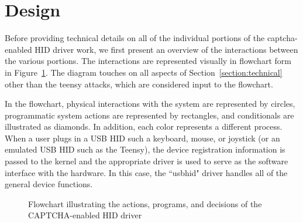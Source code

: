 \documentclass[pagenumbers]{ieee}
\begin{document}
\section{Design}
\label{section:design}

Before providing technical details on all of the individual portions of the captcha-enabled HID driver work, we first present an overview of the interactions between the various portions. The interactions are represented visually in flowchart form in Figure~\ref{fig:flowchart}. The diagram touches on all aspects of Section~\ref{section:technical} other than the teensy attacks, which are considered input to the flowchart.

In the flowchart, physical interactions with the system are represented by circles, programmatic system actions are represented by rectangles, and conditionals are illustrated as diamonds. In addition, each color represents a different process. When a user plugs in a USB HID such a keyboard, mouse, or joystick (or an emulated USB HID such as the Teensy), the device registration information is passed to the kernel and the appropriate driver is used to serve as the software interface with the hardware. In this case, the ``usbhid" driver handles all of the general device functions. 

\begin{figure}[H]
   \caption{Flowchart illustrating the actions, programs, and decisions of the CAPTCHA-enabled HID driver}
   \label{fig:flowchart}
\end{figure}
\end{document}
